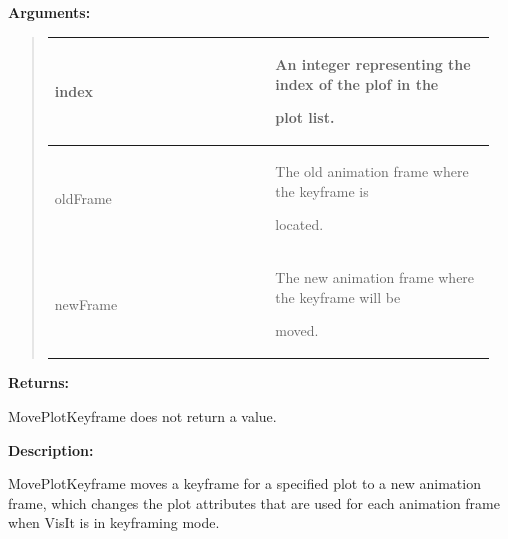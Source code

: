\documentclass[letterpaper,10pt,english]{sphinxmanual}
\begin{document}
\begin{DUlineblock}{0em}
\item[] 
\item[] \textbf{Arguments:}
\end{DUlineblock}
\begin{quote}

\begin{tabular}{|p{0.475\linewidth}|p{0.475\linewidth}|}
\hline

index
 & 
\begin{DUlineblock}{0em}
\item[] An integer representing the index of the plof in the
\item[] plot list.
\end{DUlineblock}
\\
\hline
oldFrame
 & 
\begin{DUlineblock}{0em}
\item[] The old animation frame where the keyframe is
\item[] located.
\end{DUlineblock}
\\
\hline
newFrame
 & 
\begin{DUlineblock}{0em}
\item[] The new animation frame where the keyframe will be
\item[] moved.
\end{DUlineblock}
\\
\hline\end{tabular}

\end{quote}

\begin{DUlineblock}{0em}
\item[] 
\item[] \textbf{Returns:}
\item[] MovePlotKeyframe does not return a value.
\item[] 
\item[] \textbf{Description:}
\item[] MovePlotKeyframe moves a keyframe for a specified plot to a new animation
frame, which changes the plot attributes that are used for each animation
frame when VisIt is in keyframing mode.
\end{DUlineblock}

\begin{DUlineblock}{0em}
\item[] 
\end{DUlineblock}
\end{document}
